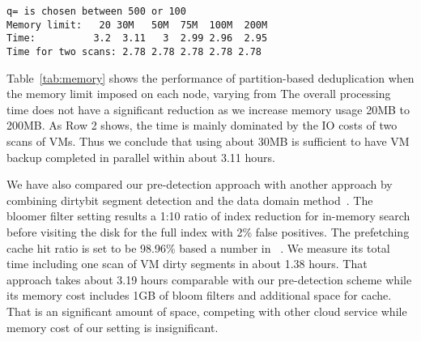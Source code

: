 

\begin{verbatim}
q= is chosen between 500 or 100
Memory limit:   20 30M   50M  75M  100M  200M
Time:          3.2  3.11   3  2.99 2.96  2.95
Time for two scans: 2.78 2.78 2.78 2.78 2.78
\end{verbatim}

Table~\ref{tab:memory} shows the performance of partition-based deduplication when 
the memory limit imposed on each node, varying from 
The overall processing time does not have a significant reduction as we increase memory usage  20MB to 200MB.
As Row 2 shows, the time is mainly dominated by  the IO costs of two scans of VMs.
Thus we conclude that using about 30MB is sufficient to have VM backup completed in parallel within about 3.11 hours.




We have also compared our pre-detection approach with another approach by combining
dirtybit segment  detection and  the data domain method~\cite{bottleneck08}. 
The bloomer filter setting  results a 1:10 ratio of index reduction for in-memory search before visiting
the disk for the full index with 2\% false positives. The prefetching cache hit ratio is set to be 98.96\% based
a number in ~\cite{bottleneck08}.
We measure its  total time including one scan of VM dirty segments in about 1.38 hours.
That approach takes about 3.19 hours comparable with our pre-detection scheme while its memory cost
includes 1GB of bloom filters and additional space for cache. That is an significant amount of space,
competing with other cloud service while memory cost of our setting is  insignificant.
 
